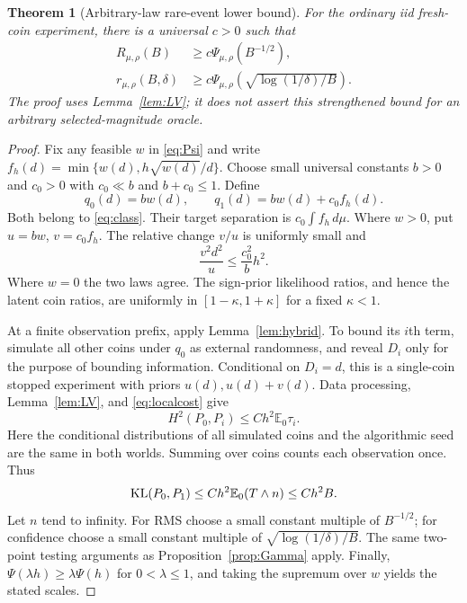 \documentclass[11pt]{article}
\newtheorem{theorem}{Theorem}[section]
\theoremstyle{definition}\newtheorem{conjecture}[theorem]{Conjecture}
\theoremstyle{remark}\newtheorem{remark}[theorem]{Remark}
\newcommand{\E}{\mathbb E}\newcommand{\PP}{\mathbb P}\newcommand{\R}{\mathbb R}
\begin{document}
\begin{theorem}[Arbitrary-law rare-event lower bound]\label{thm:PsiLower}
For the ordinary iid fresh-coin experiment, there is a universal $c>0$ such that
\begin{align}
 R_{\mu,\rho}(B)&\ge c\Psi_{\mu,\rho}(B^{-1/2}),\label{eq:psilowr}\\
 r_{\mu,\rho}(B,\delta)&\ge c\Psi_{\mu,\rho}\left(\sqrt{\log(1/\delta)/B}\right).\label{eq:psilowh}
\end{align}
The proof uses Lemma~\ref{lem:LV}; it does not assert this strengthened bound for an arbitrary selected-magnitude oracle.
\end{theorem}
\begin{proof}
Fix any feasible $w$ in \eqref{eq:Psi} and write $f_h(d)=\min\{w(d),h\sqrt{w(d)}/d\}$. Choose small universal constants $b>0$ and $c_0>0$ with $c_0\ll b$ and $b+c_0\le1$. Define
\[
 q_0(d)=bw(d),\qquad q_1(d)=bw(d)+c_0f_h(d).
\]
Both belong to \eqref{eq:class}. Their target separation is $c_0\int f_h\,d\mu$.
Where $w>0$, put $u=bw$, $v=c_0f_h$. The relative change $v/u$ is uniformly small and
\begin{equation}\label{eq:localcost}
 \frac{v^2d^2}{u}\le \frac{c_0^2}{b}h^2.
\end{equation}
Where $w=0$ the two laws agree. The sign-prior likelihood ratios, and hence the latent coin ratios, are uniformly in $[1-\kappa,1+\kappa]$ for a fixed $\kappa<1$.

At a finite observation prefix, apply Lemma~\ref{lem:hybrid}. To bound its $i$th term, simulate all other coins under $q_0$ as external randomness, and reveal $D_i$ only for the purpose of bounding information. Conditional on $D_i=d$, this is a single-coin stopped experiment with priors $u(d),u(d)+v(d)$. Data processing, Lemma~\ref{lem:LV}, and \eqref{eq:localcost} give
\[
 H^2(P_0,P_i)\le C h^2\E_0\tau_i.
\]
Here the conditional distributions of all simulated coins and the algorithmic seed are the same in both worlds. Summing over coins counts each observation once. Thus
\[
 \KL(P_0,P_1)\le C h^2\E_0(T\wedge n)\le Ch^2B.
\]
Let $n$ tend to infinity. For RMS choose a small constant multiple of $B^{-1/2}$; for confidence choose a small constant multiple of $\sqrt{\log(1/\delta)/B}$. The same two-point testing arguments as Proposition~\ref{prop:Gamma} apply. Finally, $\Psi(\lambda h)\ge\lambda\Psi(h)$ for $0<\lambda\le1$, and taking the supremum over $w$ yields the stated scales.
\end{proof}
\end{document}
